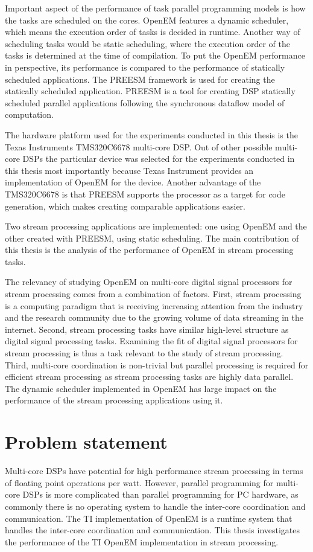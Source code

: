 Important aspect of the performance of task parallel programming models is how the tasks are scheduled on the cores. OpenEM features a dynamic scheduler, which means the execution order of tasks is decided in runtime. Another way of scheduling tasks would be static scheduling, where the execution order of the tasks is determined at the time of compilation. To put the OpenEM performance in perspective, its performance is compared to the performance of statically scheduled applications. The PREESM framework is used for creating the statically scheduled application. PREESM is a tool for creating DSP statically scheduled parallel applications following the synchronous dataflow model of computation.

The hardware platform used for the experiments conducted in this thesis is the Texas Instruments TMS320C6678 multi-core DSP. Out of other possible multi-core DSPs the particular device was selected for the experiments conducted in this thesis most importantly because Texas Instrument provides an implementation of OpenEM for the device. Another advantage of the TMS320C6678 is that PREESM supports the processor as a target for code generation, which makes creating comparable applications easier.

Two stream processing applications are implemented: one using OpenEM and the other created with PREESM, using static scheduling. The main contribution of this thesis is the analysis of the performance of OpenEM in stream processing tasks.

The relevancy of studying OpenEM on multi-core digital signal processors for stream processing comes from a combination of factors. First, stream processing is a computing paradigm that is receiving increasing attention from the industry and the research community due to the growing volume of data streaming in the internet. Second, stream processing tasks have similar high-level structure as digital signal processing tasks. Examining the fit of digital signal processors for stream processing is thus a task relevant to the study of stream processing. Third, multi-core coordination is non-trivial but parallel processing is required for efficient stream processing as stream processing tasks are highly data parallel. The dynamic scheduler implemented in OpenEM has large impact on the performance of the stream processing applications using it.

\section{Problem statement}
\label{section:problem-statement}
Multi-core DSPs have potential for high performance stream processing in terms of floating point operations per watt. However, parallel programming for multi-core DSPs is more complicated than parallel programming for PC hardware, as commonly there is no operating system to handle the inter-core coordination and communication. The TI implementation of OpenEM is a runtime system that handles the inter-core coordination and communication. This thesis investigates the performance of the TI OpenEM implementation in stream processing.

